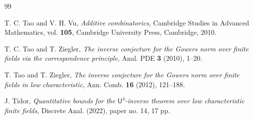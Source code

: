 \documentclass[a4paper,11pt]{article}
\numberwithin{theorem}{section}
\theoremstyle{definition}
\renewenvironment{thebibliography}[1]
{
  \begin{oldthebibliography}{#1}
    \setlength{\itemsep}{0em  plus 0.3ex}
    \setlength{\parskip}{0em}
}
{
  \end{oldthebibliography}
}
\begin{document}
\begin{thebibliography}{99}

 T. C. Tao and V. H. Vu, \textit{Additive combinatorics}, Cambridge Studies in Advanced Mathematics, vol. \textbf{105}, Cambridge University Press, Cambridge, 2010.

  T. C. Tao and T. Ziegler, \textit{The inverse conjecture for the Gowers norm over finite fields via the correspondence principle}, Anal. PDE \textbf{3} (2010), 1--20.

 T. Tao and T. Ziegler, \textit{The inverse conjecture for the Gowers norm over finite fields in low characteristic}, Ann. Comb. \textbf{16} (2012), 121--188.

 J. Tidor, \textit{Quantitative bounds for the $\mathsf{U}^4$-inverse theorem over low characteristic finite fields}, Discrete Anal. (2022), paper no. 14, 17 pp.


\end{thebibliography}
\end{document}
